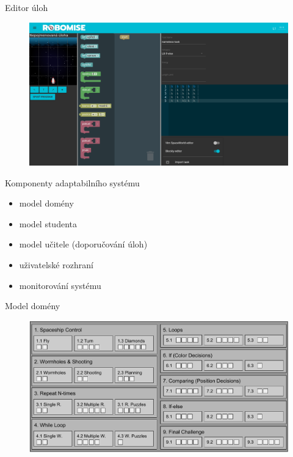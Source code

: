\documentclass[
]{beamer}
\begin{document}
\begin{frame}{Editor úloh}
\begin{figure}
\includegraphics[width=\textwidth,height=.75\textheight,keepaspectratio]{../img/task-editor}
\end{figure}
\end{frame}


\begin{frame}{Komponenty adaptabilního systému}
\begin{itemize}
\item model domény %
\item model studenta  %
\item model učitele (doporučování úloh)
\item uživatelské rozhraní  %
\item monitorování systému  %
\end{itemize}
\end{frame}


\begin{frame}{Model domény}
\begin{figure}
\includegraphics[width=\textwidth,height=.75\textheight,keepaspectratio]{../img/robomission-domain}
\end{figure}
\end{frame}
\end{document}
